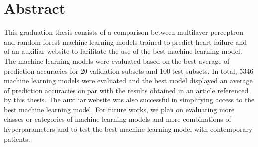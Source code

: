 \chapter*{Abstract}

This graduation thesis consists of a comparison between multilayer perceptron and random forest machine learning models trained to predict heart failure and of an auxiliar website to facilitate the use of the best machine learning model. The machine learning models were evaluated based on the best average of prediction accuracies for 20 validation subsets and 100 test subsets. In total, 5346 machine learning models were evaluated and the best model displayed an average of prediction accuracies on par with the results obtained in an article referenced by this thesis. The auxiliar website was also successful in simplifying access to the best machine learning model. For future works, we plan on evaluating more classes or categories of machine learning models and more combinations of hyperparameters and to test the best machine learning model with contemporary patients.
